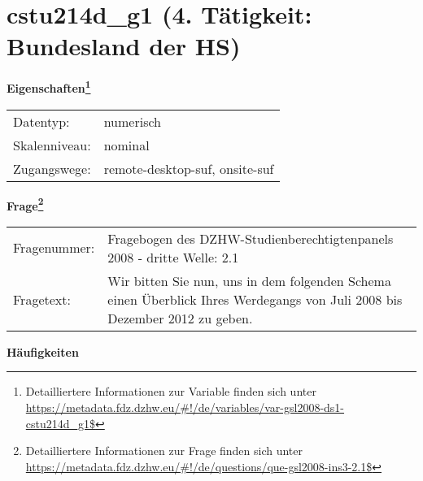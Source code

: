 
    \setcounter{footnote}{0}

    \vspace*{-1.8cm}
	\section{cstu214d\_g1 (4. Tätigkeit: Bundesland der HS)}
	\label{section:cstu214d_g1}



    \vspace*{0.5cm}
    \noindent\textbf{Eigenschaften\footnote{Detailliertere Informationen zur Variable finden sich unter
		\url{https://metadata.fdz.dzhw.eu/\#!/de/variables/var-gsl2008-ds1-cstu214d_g1$}}}\\
	\begin{tabularx}{\hsize}{@{}lX}
	Datentyp: & numerisch \\
	Skalenniveau: & nominal \\
	Zugangswege: &
	  remote-desktop-suf, 
	  onsite-suf
 \\
    \end{tabularx}



				\vspace*{0.5cm}
                \noindent\textbf{Frage\footnote{Detailliertere Informationen zur Frage finden sich unter
		              \url{https://metadata.fdz.dzhw.eu/\#!/de/questions/que-gsl2008-ins3-2.1$}}}\\
				\begin{tabularx}{\hsize}{@{}lX}
					Fragenummer: &
					  Fragebogen des DZHW-Studienberechtigtenpanels 2008 - dritte Welle:
					  2.1
 \\
					Fragetext: & Wir bitten Sie nun, uns in dem folgenden Schema einen Überblick Ihres Werdegangs von Juli 2008 bis Dezember 2012 zu geben. \\
				\end{tabularx}





        		\vspace*{0.5cm}
                \noindent\textbf{Häufigkeiten}

